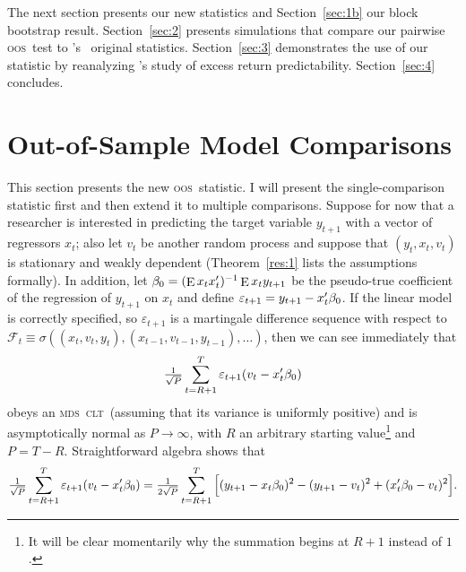 \documentclass[11pt,fleqn]{article}
\newcommand\citepos[2][]{\citeauthor{#2}'s \citeyearpar[#1]{#2}}
\newcommand\poscw{\citeauthor{ClW:06}'s \citeyearpar{ClW:06,ClW:07}}
\theoremstyle{definition}
\DeclareMathOperator{\E}{E}
\newcommand{\btrue}[1][]{\if#1*\hat\beta_{T+1}\else\beta_0\fi}
\newcommand{\osum}[1]{\sum_{#1=R+1}^T}
\newcommand{\oclt}[1]{\tfrac{1}{\sqrt{P}} \osum{#1}}
\newcommand{\clt}{\textsc{clt}}
\newcommand{\mds}{\textsc{mds}}
\newcommand{\oos}{\textsc{oos}}
\begin{document}
The next section presents our new statistics and Section~\ref{sec:1b}
our block bootstrap result.  Section~\ref{sec:2} presents
simulations that compare our pairwise \oos\ test to \poscw\ original
statistics.  Section~\ref{sec:3} demonstrates the use of our statistic
by reanalyzing \citepos{GoW:08} study of excess return
predictability. Section~\ref{sec:4} concludes.

\section{Out-of-Sample Model Comparisons}\label{sec:1}
This section presents the new \oos\ statistic.  I will present the
single-comparison statistic first and then extend it to multiple
comparisons.  Suppose for now that a researcher is interested in
predicting the target variable $y_{t+1}$ with a vector of regressors
$x_t$; also let $v_t$ be another random process and suppose that
$(y_t, x_t, v_t)$ is stationary and weakly dependent
(Theorem~\ref{res:1} lists the assumptions formally).  In addition,
let $\btrue = (\E x_t x_t')^{-1} \E x_t y_{t+1}$ be the pseudo-true
coefficient of the regression of $y_{t+1}$ on $x_t$ and define
$\varepsilon_{t+1} = y_{t+1} - x_t'\btrue$.  If the linear model is
correctly specified, so $\varepsilon_{t+1}$ is a martingale difference
sequence with respect to $\mathcal{F}_t \equiv \sigma((x_t, v_t, y_t),
(x_{t-1}, v_{t-1}, y_{t-1}),\dots)$, then we can see immediately that
\begin{equation}
  \label{eq:4}
  \oclt{t} \varepsilon_{t+1} (v_t - x_t'\btrue)
\end{equation}
obeys an \mds\ \clt\ (assuming that its variance is uniformly
positive) and is asymptotically normal as $P \to \infty$, with $R$ an
arbitrary starting value\footnote{It will be clear momentarily why the
  summation begins at $R+1$ instead of $1$.} and $P = T - R$.
Straightforward algebra \citep{ClW:07} shows that
\begin{equation}
  \label{eq:5}
  \tfrac{1}{\sqrt{P}} \osum{t} \varepsilon_{t+1} (v_t -
  x_t'\btrue) = \tfrac{1}{2 \sqrt{P}} \osum{t} \Big[(y_{t+1} -
  x_t\btrue)^2 - (y_{t+1} - v_t)^2 + (x_t'\btrue - v_t)^2 \Big].
\end{equation}
\end{document}
